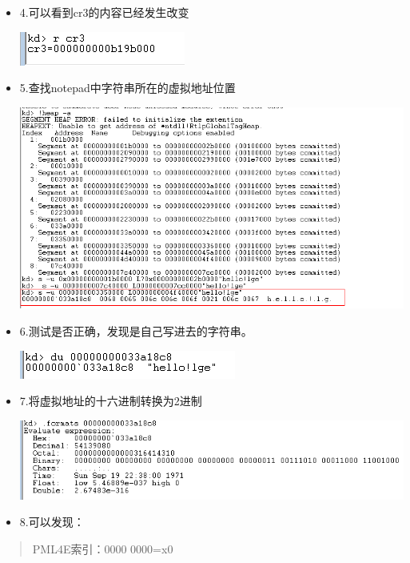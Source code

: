 \documentclass[UTF8]{ctexart}
\begin{document}
\begin{itemize}
\begin{itemize}
\item 4.可以看到cr3的内容已经发生改变
\begin{center}
\includegraphics[width=.9\linewidth]{image/19.png}
\end{center}
\item 5.查找notepad中字符串所在的虚拟地址位置
\begin{center}
\includegraphics[width=.9\linewidth]{image/20.png}
\end{center}
\item 6.测试是否正确，发现是自己写进去的字符串。
\begin{center}
\includegraphics[width=.9\linewidth]{image/21.png}
\end{center}
\item 7.将虚拟地址的十六进制转换为2进制
\begin{center}
\includegraphics[width=.9\linewidth]{image/22.png}
\end{center}
\item 8.可以发现：
\end{itemize}
\begin{verse}
PML4E索引：0000 0000=x0\\

\end{verse}
\end{itemize}
\end{document}
